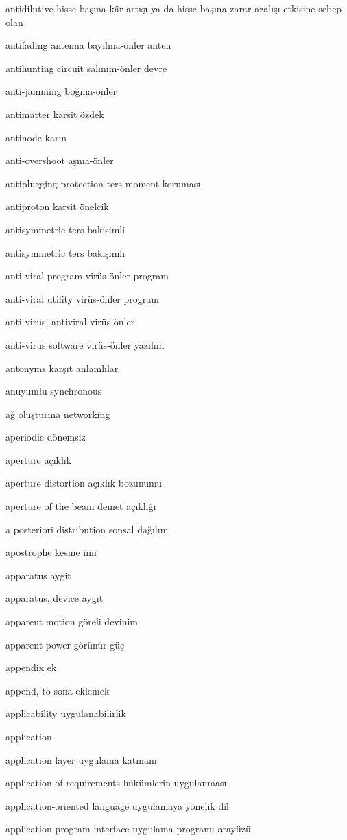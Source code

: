 \documentclass[12pt,fleqn]{article}\usepackage{../../common}
\begin{document}
antidilutive hisse başına kâr artışı ya da hisse başına zarar azalışı etkisine sebep olan

antifading antenna bayılma-önler anten

antihunting circuit salınım-önler devre

anti-jamming boğma-önler

antimatter karsit özdek

antinode karın

anti-overshoot aşma-önler

antiplugging protection ters moment koruması

antiproton karsit önelcik

antisymmetric ters bakisimli

antisymmetric ters bakışımlı

anti-viral program virüs-önler program

anti-viral utility virüs-önler program

anti-virus; antiviral virüs-önler

anti-virus software virüs-önler yazılım

antonyms karşıt anlamlılar

anuyumlu synchronous

ağ oluşturma networking

aperiodic dönemsiz

aperture açıklık

aperture distortion açıklık bozunumu

aperture of the beam demet açıklığı

a posteriori distribution sonsal dağılım

apostrophe kesme imi

apparatus aygit

apparatus, device aygıt

apparent motion göreli devinim

apparent power görünür güç

appendix ek

append, to sona eklemek

applicability uygulanabilirlik

application

application layer uygulama katmanı

application of requirements hükümlerin uygulanması

application-oriented language uygulamaya yönelik dil

application program interface uygulama programı arayüzü
\end{document}
